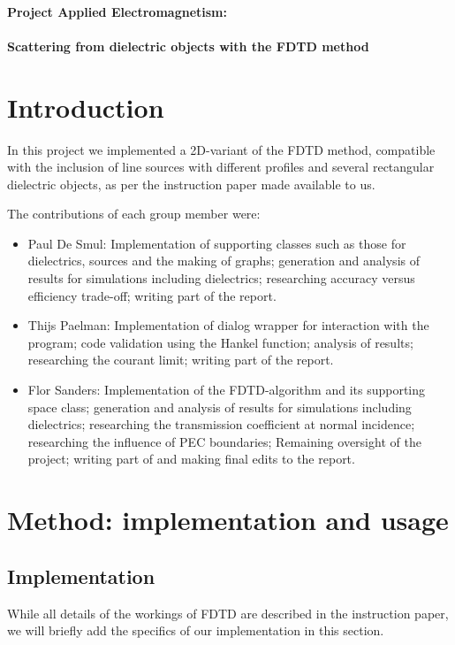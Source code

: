 \documentclass[11pt, a4paper]{article}
\begin{document}
\paragraph{\Large Project Applied Electromagnetism:\\\\Scattering from dielectric objects with the FDTD method}

\section{Introduction}

In this project we implemented a 2D-variant of the FDTD method, compatible with the inclusion of line sources with different profiles and several rectangular dielectric objects, as per the instruction paper made available to us.

The contributions of each group member were:
\begin{itemize}
    \item Paul De Smul: Implementation of supporting classes such as those for dielectrics, sources and the making of graphs; generation and analysis of results for simulations including dielectrics; researching accuracy versus efficiency trade-off; writing part of the report.
    \item Thijs Paelman: Implementation of dialog wrapper for interaction with the program; code validation using the Hankel function;  analysis of results; researching the courant limit; writing part of the report.
    \item Flor Sanders: Implementation of the FDTD-algorithm and its supporting space class; generation and analysis of results for simulations including dielectrics; researching the transmission coefficient at normal incidence; researching the influence of PEC boundaries; Remaining oversight of the project; writing part of and making final edits to the report.
\end{itemize}

\section{Method: implementation and usage}

\subsection{Implementation} %
While all details of the workings of FDTD are described in the instruction paper, we will briefly add the specifics of our implementation in this section.
\end{document}
